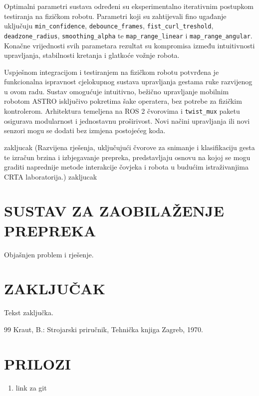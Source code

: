 \documentclass[12pt,a4paper,oneside]{report}
\newcommand{\naslovbeznumeracije}[1]{%
  \chapter*{#1}
  \addcontentsline{toc}{chapter}{#1}
}
\begin{document}
Optimalni parametri sustava određeni su eksperimentalno iterativnim postupkom testiranja na fizičkom robotu. 
Parametri koji su zahtijevali fino ugađanje uključuju \texttt{min\_confidence}, \texttt{debounce\_frames}, 
\texttt{fist\_curl\_treshold}, \texttt{deadzone\_radius}, \texttt{smoothing\_alpha} te \texttt{map\_range\_linear} i \texttt{map\_range\_angular}.
Konačne vrijednosti svih parametara rezultat su kompromisa između intuitivnosti upravljanja, 
stabilnosti kretanja i glatkoće vožnje robota.

Uspješnom integracijom i testiranjem na fizičkom robotu potvrđena je funkcionalna ispravnost cjelokupnog 
sustava upravljanja gestama ruke razvijenog u ovom radu. Sustav omogućuje intuitivno, bežično upravljanje 
mobilnim robotom ASTRO isključivo pokretima šake operatera, bez potrebe za fizičkim kontrolerom. 
Arhitektura temeljena na ROS 2 čvorovima i \texttt{twist\_mux} paketu osigurava modularnost i jednostavnu 
proširivost. Novi načini upravljanja ili novi senzori mogu se dodati bez izmjena postojećeg koda. 

zakljucak
(Razvijena rješenja, uključujući čvorove za snimanje i klasifikaciju gesta te izračun brzina i izbjegavanje prepreka, 
predstavljaju osnovu na kojoj se mogu graditi naprednije metode interakcije čovjeka i robota u budućim istraživanjima CRTA laboratorija.)
zakljucak

\chapter{SUSTAV ZA ZAOBILAŽENJE PREPREKA}
Objašnjen problem i rješenje.


\chapter{ZAKLJUČAK}
Tekst zaključka.

{}
\begin{thebibliography}{99}
 Kraut, B.: Strojarski priručnik, Tehnička knjiga Zagreb, 1970.
\end{thebibliography}

\naslovbeznumeracije{PRILOZI}
\begin{enumerate}[label=\Roman*.]
  \item link za git
\end{enumerate}
\end{document}

